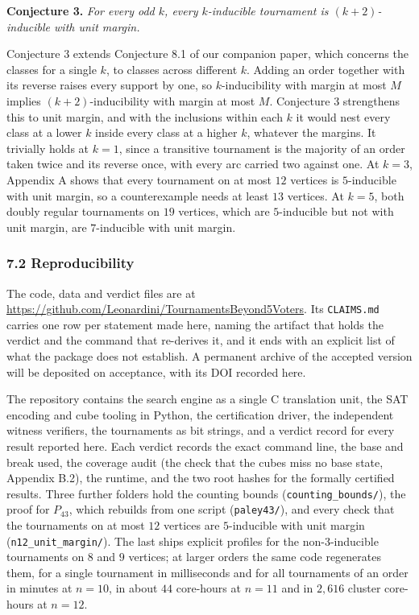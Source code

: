 \documentclass[
]{article}
\begin{document}
\textbf{Conjecture 3.} \emph{For every odd \(k\), every \(k\)-inducible
tournament is \((k+2)\)-inducible with unit margin.}

Conjecture 3 extends Conjecture 8.1 of our companion paper, which
concerns the classes for a single \(k\), to classes across different
\(k\). Adding an order together with its reverse raises every support by
one, so \(k\)-inducibility with margin at most \(M\) implies
\((k+2)\)-inducibility with margin at most \(M\). Conjecture 3
strengthens this to unit margin, and with the inclusions within each
\(k\) it would nest every class at a lower \(k\) inside every class at a
higher \(k\), whatever the margins. It trivially holds at \(k = 1\),
since a transitive tournament is the majority of an order taken twice
and its reverse once, with every arc carried two against one. At
\(k = 3\), Appendix A shows that every tournament on at most \(12\)
vertices is \(5\)-inducible with unit margin, so a counterexample needs
at least \(13\) vertices. At \(k = 5\), both doubly regular tournaments
on \(19\) vertices, which are \(5\)-inducible but not with unit margin,
are \(7\)-inducible with unit margin.

\subsubsection{7.2 Reproducibility}\label{reproducibility}

The code, data and verdict files are at
\url{https://github.com/Leonardini/TournamentsBeyond5Voters}. Its
\texttt{CLAIMS.md} carries one row per statement made here, naming the
artifact that holds the verdict and the command that re-derives it, and
it ends with an explicit list of what the package does not establish. A
permanent archive of the accepted version will be deposited on
acceptance, with its DOI recorded here.

The repository contains the search engine as a single C translation
unit, the SAT encoding and cube tooling in Python, the certification
driver, the independent witness verifiers, the tournaments as bit
strings, and a verdict record for every result reported here. Each
verdict records the exact command line, the base and break used, the
coverage audit (the check that the cubes miss no base state, Appendix
B.2), the runtime, and the two root hashes for the formally certified
results. Three further folders hold the counting bounds
(\texttt{counting\_bounds/}), the proof for \(P_{43}\), which rebuilds
from one script (\texttt{paley43/}), and every check that the
tournaments on at most \(12\) vertices are \(5\)-inducible with unit
margin (\texttt{n12\_unit\_margin/}). The last ships explicit profiles
for the non-3-inducible tournaments on \(8\) and \(9\) vertices; at
larger orders the same code regenerates them, for a single tournament in
milliseconds and for all tournaments of an order in minutes at
\(n = 10\), in about \(44\) core-hours at \(n = 11\) and in \(2{,}616\)
cluster core-hours at \(n = 12\).
\end{document}
